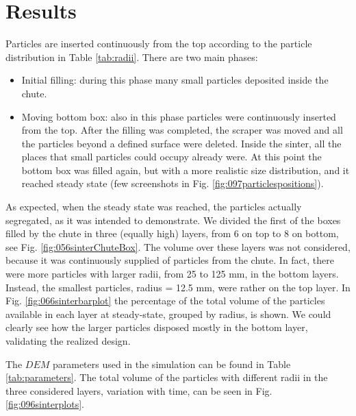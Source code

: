 \section{Results}
\label{sec:results}




Particles are inserted continuously from the top according to the particle
distribution in Table \ref{tab:radii}.
There are two main phases:
\begin{itemize}
  \item{Initial filling: during this phase many small particles deposited inside
  the chute.}
  \item{Moving bottom box: also in this phase particles were
continuously inserted from the top. After the filling was completed, the
scraper was moved and all the particles beyond a defined surface were
deleted. Inside the sinter, all the places that small particles could
occupy already were. At this point the bottom box was filled again, but
with a more realistic size distribution, and it reached steady state 
(few screenshots in Fig. \ref{fig:097particlespositions}).}
\end{itemize}
As expected, when the steady state was reached, the particles actually
segregated, as it was intended to demonstrate.
We divided the first of the boxes
filled by the chute in three (equally high) layers, from 6 on top to 8 
on bottom, see Fig. \ref{fig:056sinterChuteBox}. 
The volume over these layers was not considered, because it was continuously 
supplied of particles from the chute.
In fact, there were more particles with larger radii, from 25 to 125 mm, in the
bottom layers.
Instead, the smallest particles, radius = 12.5 mm, were rather on the top layer. 
In Fig. \ref{fig:066sinterbarplot} the
percentage of the total volume of the particles available in each layer at steady-state, 
grouped by radius, is shown. 
We could clearly see how the larger particles disposed mostly 
in the bottom layer, validating the realized design.




The $DEM$ parameters used in the simulation can be found in Table
\ref{tab:parameters}.
The total volume of the particles with different radii in the three considered
layers, variation with time, can
be seen in Fig. \ref{fig:096sinterplots}.




